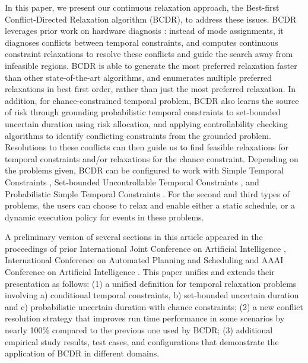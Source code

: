 \documentclass[jair,twoside,11pt,theapa]{article}
\begin{document}
In this paper, we present our continuous relaxation approach, the Best-first
Conflict-Directed Relaxation algorithm (BCDR), to address these issues. BCDR
leverages prior work on hardware diagnosis \cite{DMS1987,Williams_CDAstar_2002}:
instead of mode assignments, it diagnoses conflicts between temporal
constraints, and computes continuous constraint relaxations to resolve these
conflicts and guide the search away from infeasible regions. BCDR is able to
generate the most preferred relaxation faster than other state-of-the-art
algorithms, and enumerates multiple preferred relaxations in best first order,
rather than just the most preferred relaxation. In addition, for
chance-constrained temporal problem, BCDR also learns the source of risk through
grounding probabilistic temporal constraints to set-bounded uncertain duration
using risk allocation, and applying controllability checking algorithms to
identify conflicting constraints from the grounded problem. Resolutions to these
conflicts can then guide us to find feasible relaxations for temporal
constraints and/or relaxations for the chance constraint. Depending on the
problems given, BCDR can be configured to work with Simple Temporal Constraints
\cite{Dechter_TCN_1991}, Set-bounded Uncontrollable Temporal Constraints
\cite{Vidal99handlingcontingency}, and Probabilistic Simple Temporal Constraints
\cite{Tsamardinos02aprobabilistic}. For the second and third types of problems,
the users can choose to relax and enable either a static schedule, or a dynamic
execution policy for events in these problems.


A preliminary version of several sections in this article appeared in the
proceedings of prior International Joint Conference on Artificial Intelligence \cite{Yu_BCDR_2013},  International Conference on Automated Planning and Scheduling
\cite{Yu_CDRU_2014,cui2015optimising} and AAAI Conference on Artificial Intelligence \cite{Fang_AAAI_2014,Yu_AAAI_2015}.
This paper unifies and extends their presentation as follows: (1) a unified
definition for temporal relaxation problems involving a) conditional temporal
constraints, b) set-bounded uncertain duration and c) probabilistic uncertain
duration with chance constraints; (2) a new conflict resolution strategy that
improves run time performance in some scenarios by nearly 100\% compared to the
previous one used by BCDR; (3) additional empirical study results, test cases, and configurations that
demonstrate the application of BCDR in different domains.

%
\end{document}
